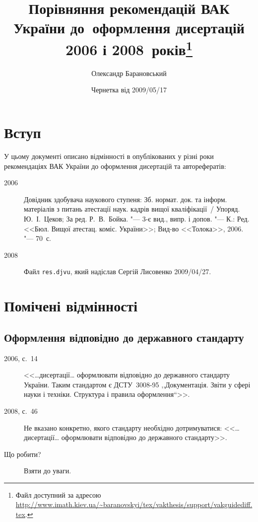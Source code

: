 \documentclass[a4paper]{article}
\begin{document}
\title{Порівняння рекомендацій ВАК України до~оформлення дисертацій 2006 і 2008~років\thanks{Файл доступний за адресою \protect\url{http://www.imath.kiev.ua/~baranovskyi/tex/vakthesis/support/vakguidediff.tex}.}}
\author{Олександр Барановський}
\date{Чернетка від 2009/05/17}

\maketitle


\section{Вступ}

У цьому документі описано відмінності в опублікованих у різні роки
рекомендаціях ВАК України до оформлення дисертацій та авторефератів:
\begin{description}
\item[2006] Довідник здобувача наукового ступеня: Зб. нормат. док. та
  інформ.  матеріалів з питань атестації наук. кадрів вищої
  кваліфікації~/ Упоряд. Ю.~І.~Цеков; За ред. Р.~В.~Бойка. "--- 3-є
  вид., випр. і допов. "--- К.: Ред. <<Бюл. Вищої
  атестац. коміс. України>>; Вид-во <<Толока>>, 2006. "--- 70~с.

\item[2008] Файл \texttt{res.djvu}, який надіслав Сергій Лисовенко
  2009/04/27.
\end{description}

\section{Помічені відмінності}

\subsection{Оформлення відповідно до державного стандарту}

\begin{description}
\item[2006, с.~14] <<\ldots{}дисертації\ldots{} оформлювати відповідно
  до державного стандарту України. Таким стандартом є ДСТУ~3008-95
  ,,Документація. Звіти у сфері науки і техніки. Структура і правила
  оформлення``>>.

\item[2008, с.~46] Не вказано конкретно, якого стандарту необхідно
  дотримуватися: <<\ldots{}дисертації\ldots{} оформлювати відповідно
  до державного стандарту>>.

\item[Що робити?] Взяти до уваги.
\end{description}
\end{document}
